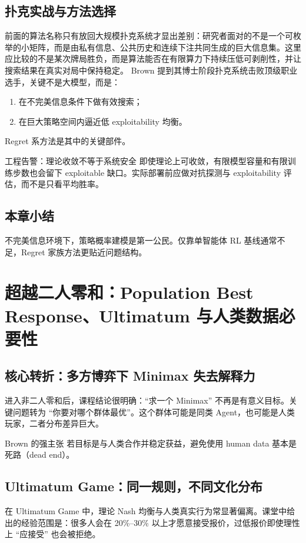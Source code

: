\documentclass[a4paper]{article}
\begin{document}
\subsection{扑克实战与方法选择}
前面的算法名称只有放回大规模扑克系统才显出差别：研究者面对的不是一个可枚举的小矩阵，而是由私有信息、公共历史和连续下注共同生成的巨大信息集。这里应比较的不是某次牌局胜负，而是算法能否在有限算力下持续压低可剥削性，并让搜索结果在真实对局中保持稳定。
Brown 提到其博士阶段扑克系统击败顶级职业选手，关键不是大模型，而是：
\begin{enumerate}
    \item 在不完美信息条件下做有效搜索；
    \item 在巨大策略空间内逼近低 exploitability 均衡。
\end{enumerate}
Regret 系方法是其中的关键部件。

\begin{warningbox}{工程告警：理论收敛不等于系统安全}
即使理论上可收敛，有限模型容量和有限训练步数也会留下 exploitable 缺口。实际部署前应做对抗探测与 exploitability 评估，而不是只看平均胜率。
\end{warningbox}

\subsection{本章小结}
不完美信息环境下，策略概率建模是第一公民。仅靠单智能体 RL 基线通常不足，Regret 家族方法更贴近问题结构。

\section{超越二人零和：Population Best Response、Ultimatum 与人类数据必要性}

\subsection{核心转折：多方博弈下 Minimax 失去解释力}
进入非二人零和后，课程结论很明确：``求一个 Minimax'' 不再是有意义目标。关键问题转为 ``你要对哪个群体最优''。这个群体可能是同类 Agent，也可能是人类玩家，二者分布差异巨大。

\begin{importantbox}{Brown 的强主张}
若目标是与人类合作并稳定获益，避免使用 human data 基本是死路（dead end）。
\end{importantbox}

\subsection{Ultimatum Game：同一规则，不同文化分布}
在 Ultimatum Game 中，理论 Nash 均衡与人类真实行为常显著偏离。课堂中给出的经验范围是：很多人会在 20\%--30\% 以上才愿意接受报价，过低报价即使理性上 ``应接受'' 也会被拒绝。
\end{document}
